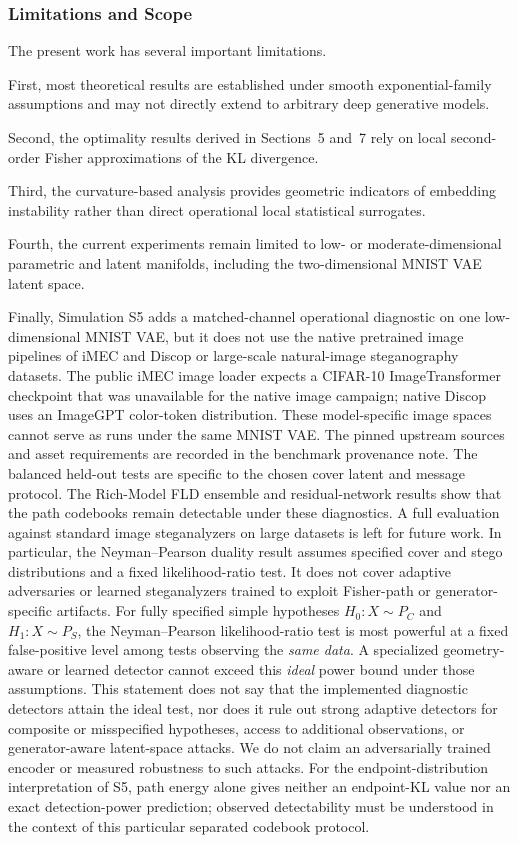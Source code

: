 \documentclass[a4paper,fleqn]{cas-dc}
\begin{document}
\subsubsection{Limitations and Scope}\label{sec:limitations}

The present work has several important limitations.

First, most theoretical results are established under smooth exponential-family assumptions and may not directly extend to arbitrary deep generative models.

Second, the optimality results derived in Sections~5 and~7 rely on local second-order Fisher approximations of the KL divergence.

Third, the curvature-based analysis provides geometric indicators of embedding instability rather than direct operational local statistical surrogates.

Fourth, the current experiments remain limited to low- or moderate-dimensional
parametric and latent manifolds, including the two-dimensional MNIST VAE latent
space.

Finally, Simulation S5 adds a matched-channel operational diagnostic on one
low-dimensional MNIST VAE, but it does not use the native pretrained image
pipelines of iMEC and Discop or large-scale natural-image steganography
datasets. The public iMEC image loader expects a CIFAR-10 ImageTransformer
checkpoint that was unavailable for the native image campaign; native
Discop uses an ImageGPT color-token distribution. These model-specific image
spaces cannot serve as runs under the same MNIST VAE. The pinned upstream
sources and asset requirements are recorded in the benchmark provenance note.
The balanced held-out tests are specific to the chosen cover latent and message
protocol. The Rich-Model FLD ensemble and residual-network results show that
the path codebooks remain detectable under these diagnostics.
A full evaluation against standard image steganalyzers on large datasets is
left for future work. In particular, the Neyman--Pearson
duality result assumes specified cover and stego distributions and a fixed
likelihood-ratio test. It does not cover adaptive adversaries or learned
steganalyzers trained to exploit Fisher-path or generator-specific artifacts.
For fully specified simple hypotheses $H_0:X\sim P_C$ and
$H_1:X\sim P_S$, the Neyman--Pearson likelihood-ratio test is most
powerful at a fixed false-positive level among tests observing the
\emph{same data}. A specialized geometry-aware or learned detector
cannot exceed this \emph{ideal} power bound under those assumptions.
This statement does not say that the implemented diagnostic detectors
attain the ideal test, nor does it rule out strong adaptive detectors
for composite or misspecified hypotheses, access to additional
observations, or generator-aware latent-space attacks. We do not
claim an adversarially trained encoder or measured robustness to
such attacks. For the endpoint-distribution interpretation of S5,
path energy alone gives neither an endpoint-KL value nor an exact
detection-power prediction; observed detectability must be understood
in the context of this particular separated codebook protocol.
\end{document}
